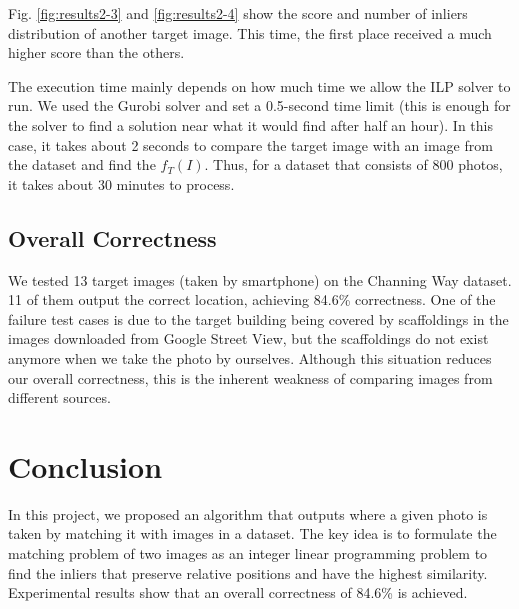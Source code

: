 \documentclass[10pt,twocolumn,letterpaper]{article}
\begin{document}
Fig. \ref{fig:results2-3} and \ref{fig:results2-4} show the score and number of inliers distribution of another target image. This time, the first place received a much higher score than the others. 

The execution time mainly depends on how much time we allow the ILP solver to run. We used the Gurobi solver \cite{gurobi} and set a 0.5-second time limit (this is enough for the solver to find a solution near what it would find after half an hour). In this case, it takes about 2 seconds to compare the target image with an image from the dataset and find the $f_T(I)$. Thus, for a dataset that consists of 800 photos, it takes about 30 minutes to process. 

\subsection{Overall Correctness}

We tested 13 target images (taken by smartphone) on the Channing Way dataset. 11 of them output the correct location, achieving 84.6\% correctness. One of the failure test cases is due to the target building being covered by scaffoldings in the images downloaded from Google Street View, but the scaffoldings do not exist anymore when we take the photo by ourselves. Although this situation reduces our overall correctness, this is the inherent weakness of comparing images from different sources. 


\section{Conclusion}

In this project, we proposed an algorithm that outputs where a given photo is taken by matching it with images in a dataset. The key idea is to formulate the matching problem of two images as an integer linear programming problem to find the inliers that preserve relative positions and have the highest similarity. Experimental results show that an overall correctness of 84.6\% is achieved. 




\end{document}
